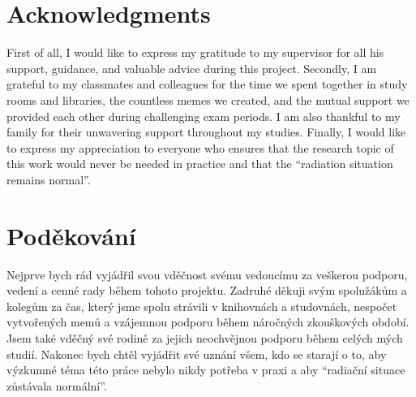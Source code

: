 
\section*{Acknowledgments}
First of all, I would like to express my gratitude to my supervisor for all his support, guidance, and valuable advice during this project.
Secondly, I am grateful to my classmates and colleagues for the time we spent together in study rooms and libraries, the countless memes we created, and the mutual support we provided each other during challenging exam periods.
I am also thankful to my family for their unwavering support throughout my studies.
Finally, I would like to express my appreciation to everyone who ensures that the research topic of this work would never be needed in practice 
and that the ``radiation situation remains normal''.

\vspace{2.5cm}








\section*{Poděkování}
Nejprve bych rád vyjádřil svou vděčnost svému vedoucímu za veškerou podporu, vedení a cenné rady během tohoto projektu. 
Zadruhé děkuji svým spolužákům a kolegům za čas, který jsme spolu strávili v knihovnách a studovnách, nespočet vytvořených memů a vzájemnou podporu během náročných zkouškových období.
Jsem také vděčný své rodině za jejich neochvějnou podporu během celých mých studií. 
Nakonec bych chtěl vyjádřit své uznání všem, kdo se starají o to, 
aby výzkumné téma této práce nebylo nikdy potřeba v praxi a aby ``radiační situace zůstávala normální''.

